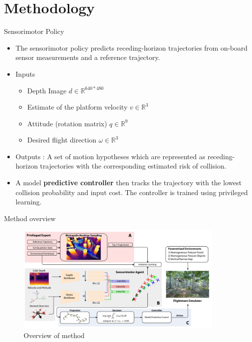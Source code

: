 \documentclass{beamer}
\begin{document}
\section{Methodology}
\begin{frame}{Sensorimotor Policy}
	\begin{itemize}
		\item The sensorimotor policy predicts receding-horizon \autocite{receding_horizon} trajectories from on-board sensor measurements and a reference trajectory.
		
		\item Inputs
		\begin{itemize}
			\item Depth Image $d \in \mathbb{R}^{640*480}$
			\item Estimate of the platform velocity $v \in \mathbb{R}^3$
			\item Attitude (rotation matrix) $q \in \mathbb{R}^9$
			\item Desired flight direction $\omega \in \mathbb{R}^3$
		\end{itemize}
	
		\item Outputs : A set of motion hypotheses which are represented as
receding-horizon trajectories with the corresponding estimated risk of collision. 
		
		\item A model \textbf{predictive controller} then tracks the trajectory with
the lowest collision probability and input cost. The controller is trained
		using privileged learning.
		
		
	\end{itemize}
\end{frame}

\begin{frame}{Method overview}
	\begin{figure}
		\includegraphics[width=4in]{images/method-overview.png}
		\caption{Overview of method}
	\end{figure}
\end{frame}
\end{document}
